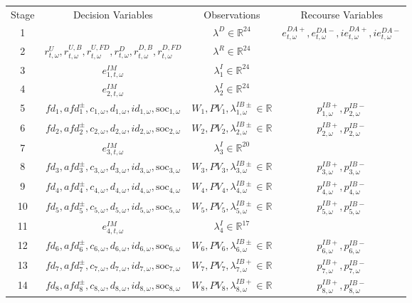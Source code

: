 \documentclass{article}
\newcommand{\R}{\mathbb{R}}
\newcommand{\soc}{\text{soc}}
\begin{document}
\begin{table}
\begin{tabular}{c c c c}
	Stage & Decision Variables & Observations & Recourse Variables \\
	1 & & $\lambda^D \in \R^{24}$ & $e^{DA+}_{t, \omega}, e^{DA-}_{t, \omega}, ie^{DA+}_{t, \omega}, ie^{DA-}_{t, \omega}$\\
	2 & $r^U_{t, \omega}, r^{U, B}_{t, \omega}, r^{U, FD}_{t, \omega}, r^{D}_{t, \omega}, r^{D, B}_{t, \omega}, r^{D, FD}_{t, \omega}$ & $\lambda^R \in \R^{24}$ & \\
	3 & $e^{IM}_{1, t, \omega}$ & $\lambda^I_1 \in \R^{24}$ &  \\
	4 & $e^{IM}_{2, t, \omega}$ & $\lambda^I_2 \in \R^{24}$ &  \\
	5 & $fd_1, afd^{\pm}_1, c_{1, \omega}, d_{1, \omega}, id_{1, \omega}, \soc_{1, \omega}$ & $W_1, PV_1, \lambda^{IB\pm}_{1, \omega} \in \R$ & $p^{IB+}_{1, \omega}, p^{IB-}_{2, \omega}$  \\
	6 & $fd_2, afd^{\pm}_2, c_{2, \omega}, d_{2, \omega}, id_{2, \omega}, \soc_{2, \omega}$ & $W_2, PV_2, \lambda^{IB\pm}_{2, \omega} \in \R$ & $p^{IB+}_{2, \omega}, p^{IB-}_{2, \omega}$ \\
	7 & $e^{IM}_{3, t, \omega}$ & $\lambda^I_3 \in \R^{20}$ &  \\
	8 & $fd_3, afd^{\pm}_3, c_{3, \omega}, d_{3, \omega}, id_{3, \omega}, \soc_{3, \omega}$  & $W_3, PV_3, \lambda^{IB\pm}_{3, \omega} \in \R$ & $p^{IB+}_{3, \omega}, p^{IB-}_{3, \omega}$ \\
	9 & $fd_4, afd^{\pm}_4, c_{4, \omega}, d_{4, \omega}, id_{4, \omega}, \soc_{4, \omega}$ & $W_4, PV_4, \lambda^{IB\pm}_{4, \omega} \in \R$ & $p^{IB+}_{4, \omega}, p^{IB-}_{4, \omega}$ \\
	10 & $fd_5, afd^{\pm}_5, c_{5, \omega}, d_{5, \omega}, id_{5, \omega}, \soc_{5, \omega}$ & $W_5, PV_5, \lambda^{IB\pm}_{5, \omega} \in \R$ & $p^{IB+}_{5, \omega}, p^{IB-}_{5, \omega}$\\
	11 & $e^{IM}_{4, t, \omega}$  & $\lambda^I_4 \in \R^{17}$ &   \\
	12 & $fd_6, afd^{\pm}_6, c_{6, \omega}, d_{6, \omega}, id_{6, \omega}, \soc_{6, \omega}$ & $W_6, PV_6, \lambda^{IB\pm}_{6, \omega} \in \R$ & $p^{IB+}_{6, \omega}, p^{IB-}_{6, \omega}$ \\
	13 & $fd_7, afd^{\pm}_7, c_{7, \omega}, d_{7, \omega}, id_{7, \omega}, \soc_{7, \omega}$ & $W_7, PV_7, \lambda^{IB+}_{7, \omega} \in \R$ & $p^{IB+}_{7, \omega}, p^{IB-}_{7, \omega}$ \\
	14 & $fd_8, afd^{\pm}_8, c_{8, \omega}, d_{8, \omega}, id_{8, \omega}, \soc_{8, \omega}$ & $W_8, PV_8, \lambda^{IB+}_{8, \omega} \in \R$ & $p^{IB+}_{8, \omega}, p^{IB-}_{8, \omega}$ \\

\end{tabular}
\end{table}
\end{document}
